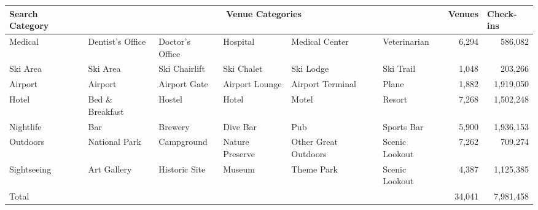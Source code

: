 \begin{sidewaystable}[]
\begin{tabular}{lrrrrrrr}
\toprule
Search Category & \multicolumn{5}{c}{Venue Categories}  & \multicolumn{1}{l}{Venues} & \multicolumn{1}{l}{Check-ins} \\
\midrule
Medical & \multicolumn{1}{l}{Dentist's Office} & \multicolumn{1}{l}{Doctor's Office} & \multicolumn{1}{l}{Hospital} & \multicolumn{1}{l}{Medical Center} & \multicolumn{1}{l}{Veterinarian} &          6,294  &              586,082  \\
Ski Area & \multicolumn{1}{l}{Ski Area} & \multicolumn{1}{l}{Ski Chairlift} & \multicolumn{1}{l}{Ski Chalet} & \multicolumn{1}{l}{Ski Lodge} & \multicolumn{1}{l}{Ski Trail} &          1,048  &              203,266  \\
Airport & \multicolumn{1}{l}{Airport} & \multicolumn{1}{l}{Airport Gate} & \multicolumn{1}{l}{Airport Lounge} & \multicolumn{1}{l}{Airport Terminal} & \multicolumn{1}{l}{Plane} &          1,882  &          1,919,050  \\
Hotel & \multicolumn{1}{l}{Bed \& Breakfast} & \multicolumn{1}{l}{Hostel} & \multicolumn{1}{l}{Hotel} & \multicolumn{1}{l}{Motel} & \multicolumn{1}{l}{Resort} &          7,268  &          1,502,248  \\
Nightlife & \multicolumn{1}{l}{Bar} & \multicolumn{1}{l}{Brewery} & \multicolumn{1}{l}{Dive Bar} & \multicolumn{1}{l}{Pub} & \multicolumn{1}{l}{Sports Bar} &          5,900  &          1,936,153  \\
Outdoors & \multicolumn{1}{l}{National Park} & \multicolumn{1}{l}{Campground} & \multicolumn{1}{l}{Nature Preserve} & \multicolumn{1}{l}{Other Great Outdoors} & \multicolumn{1}{l}{Scenic Lookout} &          7,262  &              709,274  \\
Sightseeing & \multicolumn{1}{l}{Art Gallery} & \multicolumn{1}{l}{Historic Site} & \multicolumn{1}{l}{Museum} & \multicolumn{1}{l}{Theme Park} & \multicolumn{1}{l}{Scenic Lookout} &          4,387  &          1,125,385  \\
\midrule
Total &       &       &       &       &       &       34,041  &          7,981,458  \\
\end{tabular}%

\end{sidewaystable}


